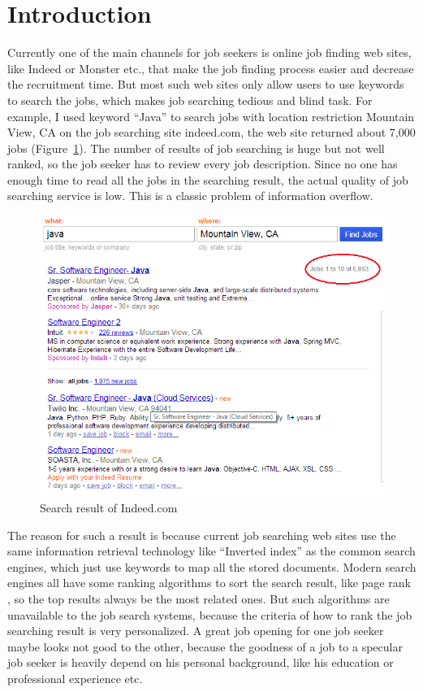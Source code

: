 \section{Introduction}
\label{sec1}

Currently one of the main channels for job seekers is online job finding web sites, like Indeed or  Monster etc., that make the job finding process easier and decrease the recruitment time. But most such web sites only allow users to use keywords to search the jobs, which makes job searching tedious and blind task. For example, I used keyword ``Java'' to search jobs with location restriction Mountain View, CA on the job searching site indeed.com, the web site returned about 7,000 jobs (Figure~\ref{fig:Indeed}). The number of results of job searching is huge but not well ranked, so the job seeker has to review every job description. Since no one has enough time to read all the jobs in the searching result, the actual quality of job searching service is low. This is a classic problem of information overflow.

\begin{figure}[htbp]
  \centering
  \includegraphics[scale=0.6]{images/indeed1.png}
  \caption{Search result of Indeed.com}
  \label{fig:Indeed}
\end{figure}

The reason for such a result is because current job searching web sites use the same information retrieval technology like ``Inverted index'' \cite{zobel2006inverted} as the common search engines, which just use keywords to map all the stored documents. Modern search engines all have some ranking algorithms to sort the search result, like page rank \cite{page1999pagerank}, so the top results always be the most related ones. But such algorithms are unavailable to the job search systems, because the criteria  of how to rank the job searching result is very personalized. A great job opening for one job seeker maybe looks not good to the other, because the goodness of a job to a specular job seeker is heavily depend on his personal background, like his education or professional experience etc.

